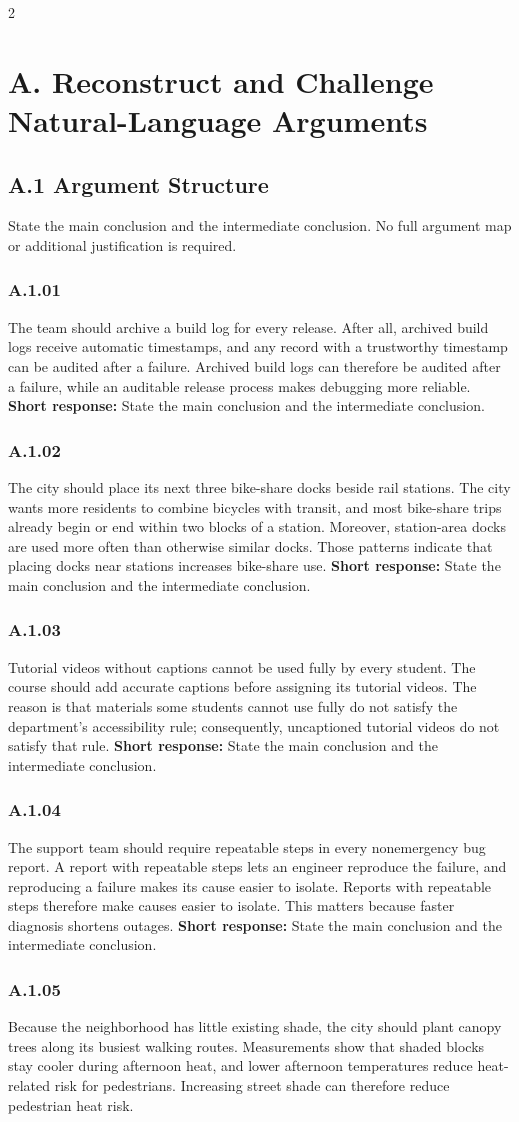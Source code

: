 \documentclass[10pt]{extarticle}
\newcommand{\bankitem}[1]{\subsubsection*{#1}}
\begin{document}
\begin{multicols}{2}
\section*{A. Reconstruct and Challenge Natural-Language Arguments}
\subsection*{A.1 Argument Structure}
State the main conclusion and the intermediate conclusion. No full argument map
or additional justification is required.
\bankitem{A.1.01}
The team should archive a build log for every release. After all, archived build logs receive automatic timestamps, and any record with a trustworthy timestamp can be audited after a failure. Archived build logs can therefore be audited after a failure, while an auditable release process makes debugging more reliable.
\textbf{Short response:} State the main conclusion and the intermediate conclusion.
\bankitem{A.1.02}
The city should place its next three bike-share docks beside rail stations. The city wants more residents to combine bicycles with transit, and most bike-share trips already begin or end within two blocks of a station. Moreover, station-area docks are used more often than otherwise similar docks. Those patterns indicate that placing docks near stations increases bike-share use.
\textbf{Short response:} State the main conclusion and the intermediate conclusion.
\bankitem{A.1.03}
Tutorial videos without captions cannot be used fully by every student. The course should add accurate captions before assigning its tutorial videos. The reason is that materials some students cannot use fully do not satisfy the department's accessibility rule; consequently, uncaptioned tutorial videos do not satisfy that rule.
\textbf{Short response:} State the main conclusion and the intermediate conclusion.
\bankitem{A.1.04}
The support team should require repeatable steps in every nonemergency bug report. A report with repeatable steps lets an engineer reproduce the failure, and reproducing a failure makes its cause easier to isolate. Reports with repeatable steps therefore make causes easier to isolate. This matters because faster diagnosis shortens outages.
\textbf{Short response:} State the main conclusion and the intermediate conclusion.
\bankitem{A.1.05}
Because the neighborhood has little existing shade, the city should plant canopy trees along its busiest walking routes. Measurements show that shaded blocks stay cooler during afternoon heat, and lower afternoon temperatures reduce heat-related risk for pedestrians. Increasing street shade can therefore reduce pedestrian heat risk.

\end{multicols}
\end{document}
